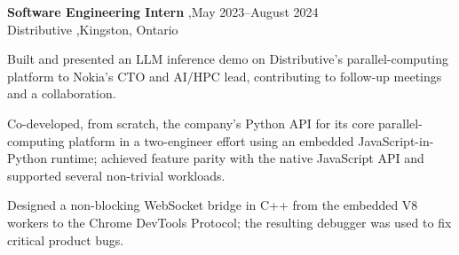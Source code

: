 \documentclass[letterpaper,10pt]{article}
\newenvironment{cvdetails}
  {%
    \begin{list}{\textbullet}{%
      \setlength{\leftmargin}{1.3em}%
      \setlength{\rightmargin}{0pt}%
      \setlength{\labelwidth}{0.6em}%
      \setlength{\labelsep}{0.4em}%
      \setlength{\itemindent}{0pt}%
      \setlength{\listparindent}{0pt}%
      \setlength{\topsep}{3pt}%
      \setlength{\partopsep}{0pt}%
      \setlength{\itemsep}{2pt}%
      \setlength{\parsep}{0pt}%
    }%
  }
  {\end{list}}
\begin{document}


\begin{itemize}

\item
  \textbf{Software Engineering Intern} \sep May 2023--August 2024\\
  Distributive \sep Kingston, Ontario
  
  \begin{cvdetails}
    \item Built and presented an LLM inference demo on Distributive's parallel-computing platform to Nokia's CTO and AI/HPC lead, contributing to follow-up meetings and a collaboration.  
    \item Co-developed, from scratch, the company’s Python API for its core parallel-computing platform in a two-engineer effort using an embedded JavaScript-in-Python runtime; achieved feature parity with the native JavaScript API and supported several non-trivial workloads.
    \item Designed a non-blocking WebSocket bridge in C++ from the embedded V8 workers to the Chrome DevTools Protocol; the resulting debugger was used to fix critical product bugs.
  \end{cvdetails}


\end{itemize}


\end{document}
